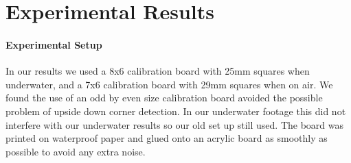 \section{Experimental Results}\label{sec:calibmatsults}
\paragraph*{Experimental Setup}In our results we used a 8x6 calibration board with 25mm squares when underwater, and a 7x6 calibration board with 29mm squares when on air. We found the use of an odd by even size calibration board avoided the possible problem of upside down corner detection. In our underwater footage this did not interfere with our underwater results so our old set up still used. The board was printed on waterproof paper and glued onto an acrylic board as smoothly as possible to avoid any extra noise. 

